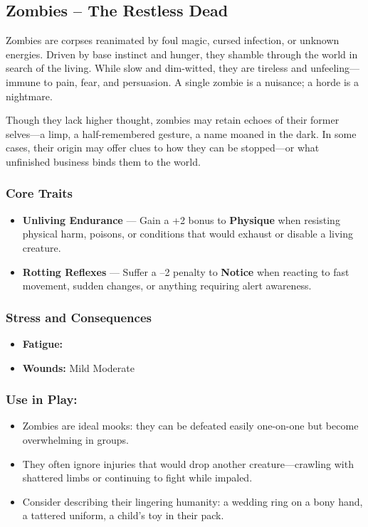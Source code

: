 \subsection*{Zombies – The Restless Dead}

Zombies are corpses reanimated by foul magic, cursed infection, or unknown energies. Driven by base instinct and hunger, they shamble through the world in search of the living. While slow and dim-witted, they are tireless and unfeeling—immune to pain, fear, and persuasion. A single zombie is a nuisance; a horde is a nightmare.

Though they lack higher thought, zombies may retain echoes of their former selves—a limp, a half-remembered gesture, a name moaned in the dark. In some cases, their origin may offer clues to how they can be stopped—or what unfinished business binds them to the world.

\subsubsection*{Core Traits}
\begin{itemize}
  \item \textbf{Unliving Endurance} — Gain a +2 bonus to \textbf{Physique} when resisting physical harm, poisons, or conditions that would exhaust or disable a living creature.

  \item \textbf{Rotting Reflexes} — Suffer a –2 penalty to \textbf{Notice} when reacting to fast movement, sudden changes, or anything requiring alert awareness.
\end{itemize}

\subsubsection*{Stress and Consequences}
\begin{itemize}
  \item \textbf{Fatigue:} \FatigueBox \FatigueBox
  \item \textbf{Wounds:} Mild \MildWound \quad Moderate \ModerateWound
\end{itemize}

\subsubsection*{Use in Play:}
\begin{itemize}
  \item Zombies are ideal mooks: they can be defeated easily one-on-one but become overwhelming in groups.
  \item They often ignore injuries that would drop another creature—crawling with shattered limbs or continuing to fight while impaled.
  \item Consider describing their lingering humanity: a wedding ring on a bony hand, a tattered uniform, a child's toy in their pack.
\end{itemize}

